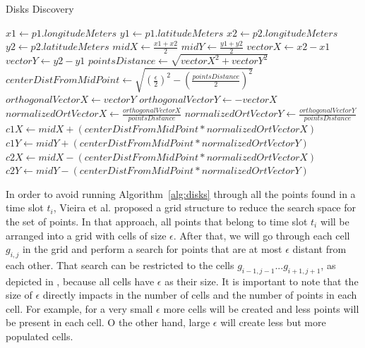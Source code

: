 \begin{algorithm}
\caption{Disks Discovery}
\label{alg:disks}
\begin{algorithmic}[1]
    \State $x1 \gets p1.longitudeMeters$
    \State $y1 \gets p1.latitudeMeters$
    \State $x2 \gets p2.longitudeMeters$
    \State $y2 \gets p2.latitudeMeters$
    \State
    \State $midX \gets \frac{x1 + x2}{2}$
    \State $midY \gets \frac{y1 + y2}{2}$
    \State
    \State $vectorX \gets x2 - x1$
    \State $vectorY \gets y2 - y1$
    \State
    \State $pointsDistance \gets \sqrt{vectorX^2 + vectorY^2}$
    \State $centerDistFromMidPoint \gets \sqrt{(\frac{\epsilon}{2})^2 - (\frac{pointsDistance}{2})^2}$
    \State
    \State $orthogonalVectorX \gets vectorY$
    \State $orthogonalVectorY \gets -vectorX$
    \State
    \State $normalizedOrtVectorX \gets \frac{orthogonalVectorX}{pointsDistance}$
    \State $normalizedOrtVectorY \gets \frac{orthogonalVectorY}{pointsDistance}$
    \State
    \State $c1X \gets midX + (centerDistFromMidPoint * normalizedOrtVectorX)$
    \State $c1Y \gets midY + (centerDistFromMidPoint * normalizedOrtVectorY)$
    \State
    \State $c2X \gets midX - (centerDistFromMidPoint * normalizedOrtVectorX)$
    \State $c2Y \gets midY - (centerDistFromMidPoint * normalizedOrtVectorY)$
\end{algorithmic}
\end{algorithm}

In order to avoid running Algorithm~\ref{alg:disks} through all the points found in a time slot $t_i$, Vieira et al.
\citep{vieira} proposed a grid structure to reduce the search space for the set of points. In that approach, all points
that belong to time slot $t_i$ will be arranged into a grid with cells of size $\epsilon$. After that, we will go
through each cell $g_{i,j}$ in the grid and perform a search for points that are at most $\epsilon$ distant from each
other. That search can be restricted to the cells $g_{i - 1, j - 1} ... g_{i + 1, j + 1}$, as depicted in
, because all cells have $\epsilon$ as their size. It is important to note that the size of $\epsilon$
directly impacts in the number of cells and the number of points in each cell. For example, for a very small $\epsilon$
more cells will be created and less points will be present in each cell.  O the other hand, large $\epsilon$ will create
less but more populated cells.

